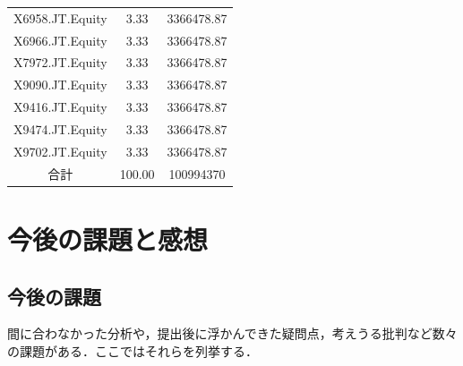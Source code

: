 ﻿\documentclass[11pt]{jreport}
\begin{document}
\begin{table}[htbp]
\begin{center}
\begin{tabular}{|c|c|c|}
X6958.JT.Equity & 3.33 & 3366478.87\\
X6966.JT.Equity & 3.33 & 3366478.87\\
X7972.JT.Equity & 3.33 & 3366478.87\\
X9090.JT.Equity & 3.33 & 3366478.87\\
X9416.JT.Equity & 3.33 & 3366478.87\\
X9474.JT.Equity & 3.33 & 3366478.87\\
X9702.JT.Equity & 3.33 & 3366478.87\\
\hline
\hline
合計& 100.00 &  100994370\\
\hline
\end{tabular}
\end{center}
\label{tbl:port2}
\end{table}

\chapter{今後の課題と感想}
\section{今後の課題}
間に合わなかった分析や，提出後に浮かんできた疑問点，考えうる批判など数々の課題がある．ここではそれらを列挙する．
\end{document}
